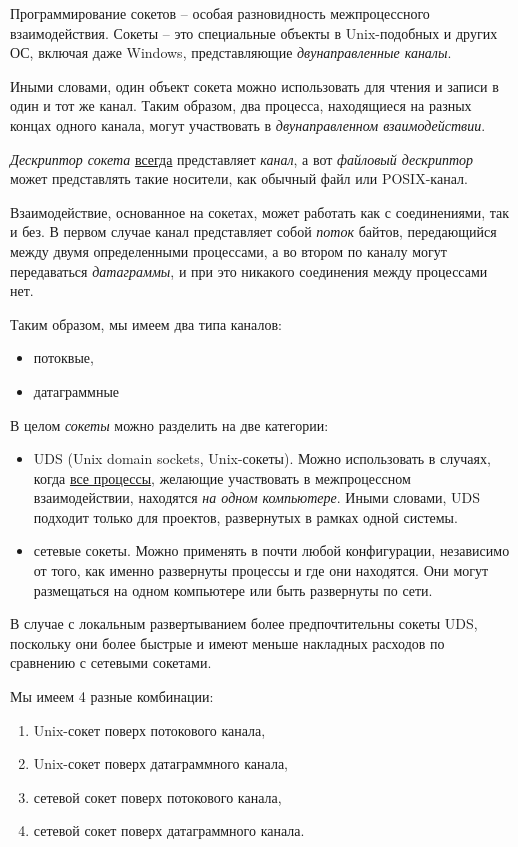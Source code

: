 \documentclass[%
	11pt,
	a4paper,
	utf8,
		]{article}
\begin{document}
Программирование сокетов -- особая разновидность межпроцессного взаимодействия. Сокеты -- это специальные объекты в Unix-подобных и других ОС, включая даже Windows, представляющие \emph{двунаправленные каналы}.

Иными словами, один объект сокета можно использовать для чтения и записи в один и тот же канал. Таким образом, два процесса, находящиеся на разных концах одного канала, могут участвовать в \emph{двунаправленном взаимодействии}.

\emph{Дескриптор сокета} \underline{всегда} представляет \emph{канал}, а вот \emph{файловый дескриптор} может представлять такие носители, как обычный файл или POSIX-канал.

Взаимодействие, основанное на сокетах, может работать как с соединениями, так и без. В первом случае канал представляет собой \emph{поток} байтов, передающийся между двумя определенными процессами, а во втором по каналу могут передаваться \emph{датаграммы}, и при это никакого соединения между процессами нет.

Таким образом, мы имеем два типа каналов:
\begin{itemize}
	\item потоквые,
	
	\item датаграммные
\end{itemize}

В целом \emph{сокеты} можно разделить на две категории:
\begin{itemize}
	\item UDS (Unix domain sockets, Unix-сокеты). Можно использовать в случаях, когда \underline{все процессы}, желающие участвовать в межпроцессном взаимодействии, находятся \emph{на одном компьютере}. Иными словами, UDS подходит только для проектов, развернутых в рамках одной системы.
	
	\item сетевые сокеты. Можно применять в почти любой конфигурации, независимо от того, как именно развернуты процессы и где они находятся. Они могут размещаться на одном компьютере или быть развернуты по сети.
\end{itemize}

В случае с локальным развертыванием более предпочтительны сокеты UDS, поскольку они более быстрые и имеют меньше накладных расходов по сравнению с сетевыми сокетами.

Мы имеем 4 разные комбинации:
\begin{enumerate}
	\item Unix-сокет поверх потокового канала,
	
	\item Unix-сокет поверх датаграммного канала,
	
	\item сетевой сокет поверх потокового канала,
	
	\item сетевой сокет поверх датаграммного канала.
\end{enumerate}
\end{document}
